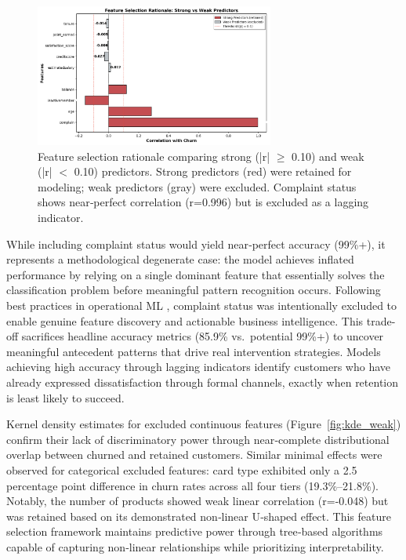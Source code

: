 \documentclass[12pt]{article}
\begin{document}
\begin{figure}[H]
\centering
\includegraphics[width=0.7\textwidth]{img/feature_selection_comparison.png}
\caption{Feature selection rationale comparing strong (|r| $\geq$ 0.10) and weak (|r| $<$ 0.10) predictors. Strong predictors (red) were retained for modeling; weak predictors (gray) were excluded. Complaint status shows near‑perfect correlation (r=0.996) but is excluded as a lagging indicator.}
\label{fig:feature_selection}
\end{figure}

While including complaint status would yield near‑perfect accuracy (99\%+), it represents a methodological degenerate case: the model achieves inflated performance by relying on a single dominant feature that essentially solves the classification problem before meaningful pattern recognition occurs. Following best practices in operational ML \citep{kumar2022customerretention}, complaint status was intentionally excluded to enable genuine feature discovery and actionable business intelligence. This trade-off sacrifices headline accuracy metrics (85.9\% vs.\ potential 99\%+) to uncover meaningful antecedent patterns that drive real intervention strategies. Models achieving high accuracy through lagging indicators identify customers who have already expressed dissatisfaction through formal channels, exactly when retention is least likely to succeed.

Kernel density estimates for excluded continuous features (Figure~\ref{fig:kde_weak}) confirm their lack of discriminatory power through near‑complete distributional overlap between churned and retained customers. Similar minimal effects were observed for categorical excluded features: card type exhibited only a 2.5 percentage point difference in churn rates across all four tiers (19.3\%–21.8\%). Notably, the number of products showed weak linear correlation (r=-0.048) but was retained based on its demonstrated non‑linear U‑shaped effect. This feature selection framework maintains predictive power through tree‑based algorithms capable of capturing non‑linear relationships while prioritizing interpretability.
\end{document}
